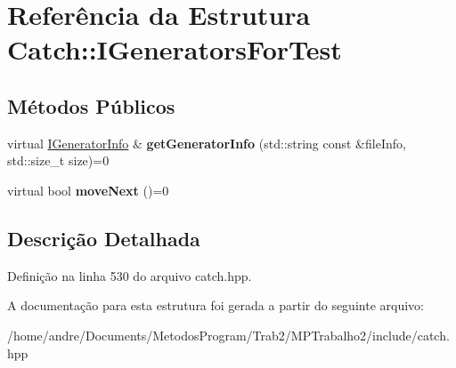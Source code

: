 \hypertarget{structCatch_1_1IGeneratorsForTest}{}\section{Referência da Estrutura Catch\+:\+:I\+Generators\+For\+Test}
\label{structCatch_1_1IGeneratorsForTest}
\subsection*{Métodos Públicos}
\begin{DoxyCompactItemize}
\item 
virtual \hyperlink{structCatch_1_1IGeneratorInfo}{I\+Generator\+Info} \& {\bfseries get\+Generator\+Info} (std\+::string const \&file\+Info, std\+::size\+\_\+t size)=0\hypertarget{structCatch_1_1IGeneratorsForTest_a180d84e858840188e4c3788e47eefdb0}{}\label{structCatch_1_1IGeneratorsForTest_a180d84e858840188e4c3788e47eefdb0}

\item 
virtual bool {\bfseries move\+Next} ()=0\hypertarget{structCatch_1_1IGeneratorsForTest_adab31832d529fc584fd63164e0a1c8ad}{}\label{structCatch_1_1IGeneratorsForTest_adab31832d529fc584fd63164e0a1c8ad}

\end{DoxyCompactItemize}


\subsection{Descrição Detalhada}


Definição na linha 530 do arquivo catch.\+hpp.



A documentação para esta estrutura foi gerada a partir do seguinte arquivo\+:\begin{DoxyCompactItemize}
\item 
/home/andre/\+Documents/\+Metodos\+Program/\+Trab2/\+M\+P\+Trabalho2/include/catch.\+hpp\end{DoxyCompactItemize}
